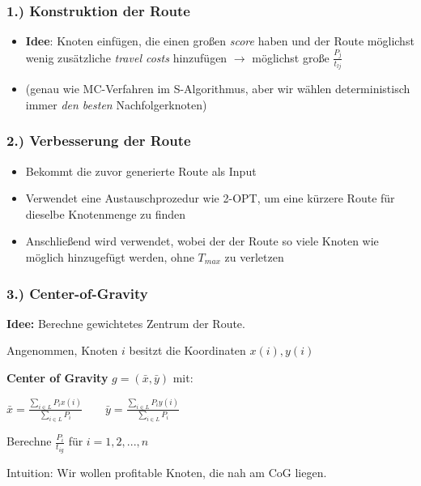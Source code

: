 \documentclass{beamer}
\begin{document}
\begin{frame}
  \frametitle{1.) Konstruktion der Route}
  \begin{itemize}
    \item \textbf{Idee}: Knoten einfügen, die einen großen \textit{score} haben und der Route möglichst wenig zusätzliche \textit{travel costs} hinzufügen\newline
    $\rightarrow$ möglichst große $\frac{P_j}{t_{lj}}$
    \item (genau wie MC-Verfahren im S-Algorithmus, aber wir wählen deterministisch immer \textit{den besten} Nachfolgerknoten)
  \end{itemize}
\end{frame}

\begin{frame}
  \frametitle{2.) Verbesserung der Route}
  \begin{itemize}
    \item Bekommt die zuvor generierte Route als Input
    \item Verwendet eine Austauschprozedur wie \textsc{2-OPT}, um eine kürzere Route für dieselbe Knotenmenge zu finden
    \item Anschließend wird  verwendet, wobei der der Route so viele Knoten wie möglich hinzugefügt werden,
    ohne $T_{max}$ zu verletzen
  \end{itemize}
\end{frame}

\begin{frame}
  \frametitle{3.) Center-of-Gravity}
  \textbf{Idee:} Berechne gewichtetes Zentrum der Route.\newline

  Angenommen, Knoten $i$ besitzt die Koordinaten $x(i), y(i)$\newline

  \textbf{Center of Gravity} $g = (\bar{x}, \bar{y})$ mit:\newline

  $\bar{x} = \frac{\sum_{i \in L} P_i x(i)}{\sum_{i \in L} P_i} \quad\quad
  \bar{y} = \frac{\sum_{i \in L} P_i y(i)}{\sum_{i \in L} P_i}$\newline

  Berechne $\frac{P_i}{t_{ig}}$ für $i = 1, 2, ..., n$\newline

  Intuition: Wir wollen profitable Knoten, die nah am CoG liegen.
\end{frame}
\end{document}
